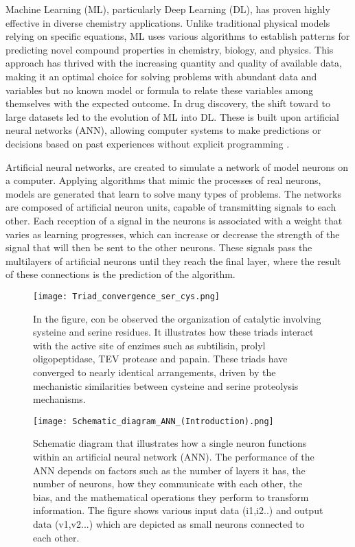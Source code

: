 \documentclass[final,times,twocolumn,article]{elsarticle}
\begin{document}
Machine Learning (ML), particularly Deep Learning (DL), has proven highly effective in diverse chemistry applications. Unlike traditional physical models relying on specific equations, ML uses various algorithms to establish patterns for predicting novel compound properties in chemistry, biology, and physics. This approach has thrived with the increasing quantity and quality of available data, making it an optimal choice for solving problems with abundant data and variables but no known model or formula to relate these variables among themselves with the expected outcome. In drug discovery, the shift toward to large datasets led to the evolution of ML into DL. These is built upon artificial neural networks (ANN), allowing computer systems to make predictions or decisions based on past experiences without explicit programming \cite{Nag2022}.

Artificial neural networks, are created to simulate a network of model neurons on a computer. Applying algorithms that mimic the processes of real neurons, models are generated that learn to solve many types of problems. The networks are composed of artificial neuron units, capable of transmitting signals to each other. Each reception of a signal in the neurons is associated with a weight that varies as learning progresses, which can increase or decrease the strength of the signal that will then be sent to the other neurons. These signals pass the multilayers of artificial neurons until they reach the final layer, where the result of these connections is the prediction of the algorithm. \cite{Talevi2020} \cite{Nag2022}

\begin{figure}[h]
    \centering 
     \texttt{[image: Triad\_convergence\_ser\_cys.png]}	
     \caption{In the figure, con be observed the organization of catalytic involving systeine and serine residues. It illustrates how these triads interact with the active site of enzimes such as subtilisin, prolyl oligopeptidase, TEV protease and papain. These triads have converged to nearly identical arrangements, driven by the mechanistic similarities between cysteine and serine proteolysis mechanisms.} 
     \label{Figure1}
 \end{figure}

\begin{figure}[h]
    \centering 
     \texttt{[image: Schematic\_diagram\_ANN\_(Introduction).png]}	
     \caption{Schematic diagram that illustrates how a single neuron functions within an artificial neural network (ANN). The performance of the ANN depends on factors such as the number of layers it has, the number of neurons, how they communicate with each other, the bias, and the mathematical operations they perform to transform information. The figure shows various input data (i1,i2..) and output data (v1,v2...) which are depicted as small neurons connected to each other.} 
     \label{Figure2}
 \end{figure}
\end{document}
